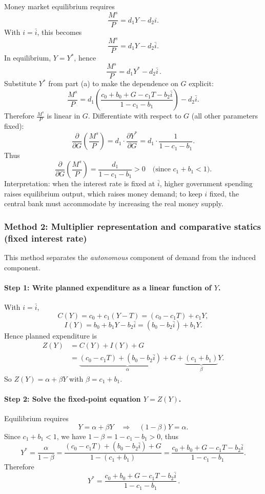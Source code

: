 \documentclass[12pt]{article}
\begin{document}
\begin{enumerate}[label=(\alph*)]
Money market equilibrium requires
\[
\frac{M^s}{P} = d_1Y - d_2 i.
\]
With \(i=\bar{i}\), this becomes
\[
\frac{M^s}{P} = d_1Y - d_2\bar{i}.
\]
In equilibrium, \(Y=Y^*\), hence
\[
\boxed{\,
\frac{M^s}{P} = d_1Y^* - d_2\bar{i}
\, }.
\]
Substitute \(Y^*\) from part (a) to make the dependence on \(G\) explicit:
\[
\frac{M^s}{P}
= d_1\left(\dfrac{c_0 + b_0 + G - c_1T - b_2\bar{i}}{1-c_1-b_1}\right) - d_2\bar{i}.
\]
Therefore \(\frac{M^s}{P}\) is linear in \(G\). Differentiate with respect to \(G\) (all other parameters fixed):
\[
\frac{\partial}{\partial G}\left(\frac{M^s}{P}\right)
= d_1\cdot \frac{\partial Y^*}{\partial G}
= d_1\cdot \frac{1}{1-c_1-b_1}.
\]
Thus
\[
\boxed{\,
\frac{\partial}{\partial G}\left(\frac{M^s}{P}\right)=\frac{d_1}{1-c_1-b_1}>0
\quad\text{(since }c_1+b_1<1\text{).}
\,}
\]
Interpretation: when the interest rate is fixed at \(\bar{i}\), higher government spending raises equilibrium output, which raises money demand; to keep \(i\) fixed, the central bank must accommodate by increasing the real money supply.
\end{enumerate}

\subsubsection*{Method 2: Multiplier representation and comparative statics (fixed interest rate)}
This method separates the \emph{autonomous} component of demand from the induced component.

\paragraph{Step 1: Write planned expenditure as a linear function of \(Y\).}
With \(i=\bar{i}\),
\[
C(Y) = c_0 + c_1(Y-T) = (c_0-c_1T) + c_1Y,
\]
\[
I(Y) = b_0 + b_1Y - b_2\bar{i} = (b_0-b_2\bar{i}) + b_1Y.
\]
Hence planned expenditure is
\begin{align*}
Z(Y) &= C(Y)+I(Y)+G \\
&= \underbrace{(c_0-c_1T)+(b_0-b_2\bar{i})+G}_{\alpha}
+ \underbrace{(c_1+b_1)}_{\beta}Y.
\end{align*}
So \(Z(Y)=\alpha+\beta Y\) with \(\beta=c_1+b_1\).

\paragraph{Step 2: Solve the fixed-point equation \(Y=Z(Y)\).}
Equilibrium requires
\[
Y = \alpha + \beta Y
\quad\Longrightarrow\quad
(1-\beta)Y = \alpha.
\]
Since \(c_1+b_1<1\), we have \(1-\beta=1-c_1-b_1>0\), thus
\[
Y^*=\frac{\alpha}{1-\beta}
=\frac{(c_0-c_1T)+(b_0-b_2\bar{i})+G}{1-(c_1+b_1)}
=\frac{c_0+b_0+G-c_1T-b_2\bar{i}}{1-c_1-b_1}.
\]
Therefore
\[
\boxed{\,
Y^*=\dfrac{c_0 + b_0 + G - c_1T - b_2\bar{i}}{1-c_1-b_1}
\, }.
\]
\end{document}
